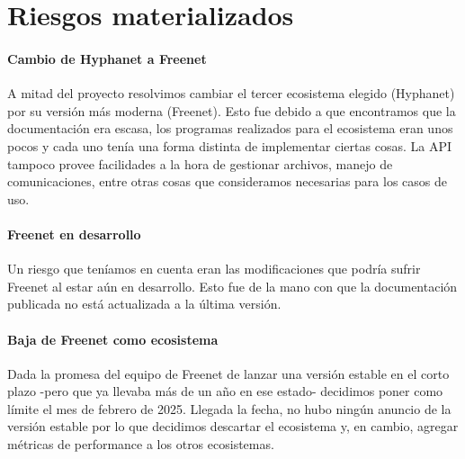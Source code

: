\section{Riesgos materializados}


\paragraph{Cambio de Hyphanet a Freenet}
A mitad del proyecto resolvimos cambiar el tercer ecosistema elegido (Hyphanet) por su versión más moderna (Freenet). Esto fue debido a que encontramos que la documentación era escasa, los programas realizados para el ecosistema eran unos pocos y cada uno tenía una forma distinta de implementar ciertas cosas. La API tampoco provee facilidades a la hora de gestionar archivos, manejo de comunicaciones, entre otras cosas que consideramos necesarias para los casos de uso.

\paragraph{Freenet en desarrollo}
Un riesgo que teníamos en cuenta eran las modificaciones que podría sufrir Freenet al estar aún en desarrollo. Esto fue de la mano con que la documentación publicada no está actualizada a la última versión.

\paragraph{Baja de Freenet como ecosistema}
Dada la promesa del equipo de Freenet de lanzar una versión estable en el corto plazo -pero que ya llevaba más de un año en ese estado- decidimos poner como límite el mes de febrero de 2025. Llegada la fecha, no hubo ningún anuncio de la versión estable por lo que decidimos descartar el ecosistema y, en cambio, agregar métricas de performance a los otros ecosistemas.